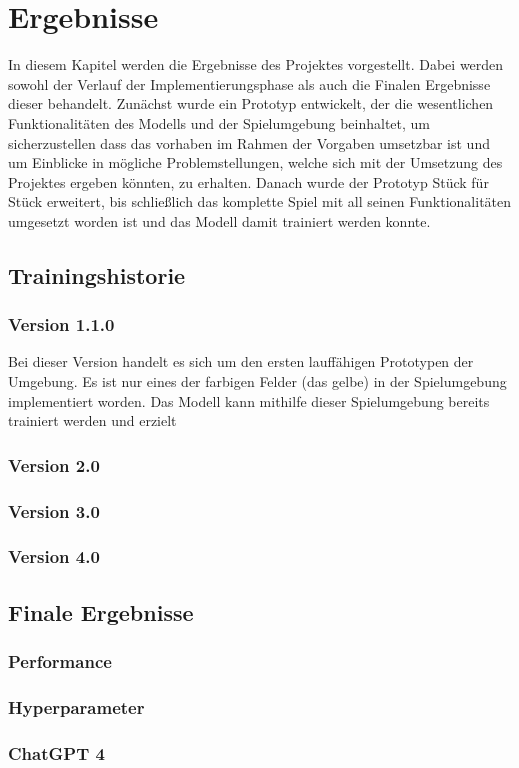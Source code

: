 \section{Ergebnisse}
In diesem Kapitel werden die Ergebnisse des Projektes vorgestellt. Dabei werden sowohl der Verlauf der Implementierungsphase als auch die Finalen Ergebnisse dieser behandelt. Zunächst wurde ein Prototyp entwickelt, der die wesentlichen Funktionalitäten des Modells und der Spielumgebung beinhaltet, um sicherzustellen dass das vorhaben im Rahmen der Vorgaben umsetzbar ist und um Einblicke in mögliche Problemstellungen, welche sich mit der Umsetzung des Projektes ergeben könnten, zu erhalten. Danach wurde der Prototyp Stück für Stück erweitert, bis schließlich das komplette Spiel mit all seinen Funktionalitäten umgesetzt worden ist und das Modell damit trainiert werden konnte.
\subsection{Trainingshistorie}
\subsubsection{Version 1.1.0}
Bei dieser Version handelt es sich um den ersten lauffähigen Prototypen der Umgebung. Es ist nur eines der farbigen Felder (das gelbe) in der Spielumgebung implementiert worden. Das Modell kann mithilfe dieser Spielumgebung bereits trainiert werden und erzielt 
\subsubsection{Version 2.0}
\subsubsection{Version 3.0}
\subsubsection{Version 4.0}
\subsection{Finale Ergebnisse}
\subsubsection{Performance}
\subsubsection{Hyperparameter}
\subsubsection{ChatGPT 4}